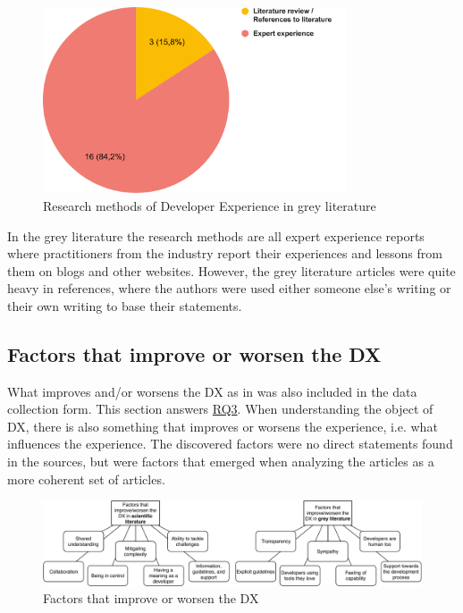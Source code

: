 \documentclass[english, 12pt, a4paper, sci, utf8, a-1b, online]{aaltothesis}
\begin{document}
\begin{figure}[ht]
  \begin{center}
    \includegraphics[width=0.8\textwidth]{research-methods-grey.pdf}
  \end{center}
  \captionsetup{width=0.6\textwidth}
  \caption{Research methods of Developer Experience in grey literature}
\end{figure}

In the grey literature the research methods are all expert experience reports where practitioners from the industry report their experiences and lessons from them on blogs and other websites. However, the grey literature articles were quite heavy in references, where the authors were used either someone else's writing or their own writing to base their statements.


\subsection{Factors that improve or worsen the DX}

What improves and/or worsens the DX as in \textcite{fagerholm-doctoral-thesis} was also included in the data collection form. This section answers \hyperref[RQ3]{RQ3}. When understanding the object of DX, there is also something that improves or worsens the experience, i.e. what influences the experience. The discovered factors were no direct statements found in the sources, but were factors that emerged when analyzing the articles as a more coherent set of articles.

\begin{figure}[h]
  \begin{center}
    \includegraphics[width=\textwidth]{factors-that-improve-worsen-the-dx.pdf}
  \end{center}
  \captionsetup{width=0.6\textwidth}
  \caption{Factors that improve or worsen the DX}
  \label{figure:factors-that-improve-worsen-the-dx}
\end{figure}
\end{document}
